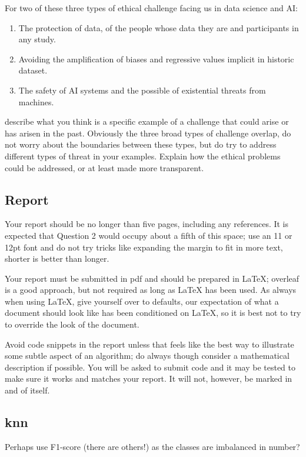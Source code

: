 \documentclass[12pt]{article}
\begin{document}
For two of these three types of ethical challenge facing us in data science and AI:
\begin{enumerate}
\item The protection of data, of the people whose data they are and participants in any study.
\item Avoiding the amplification of biases and regressive values implicit in historic dataset.
\item The safety of AI systems and the possible of existential threats from machines.
\end{enumerate}
describe what you think is a specific example of a challenge that
could arise or has arisen in the past. Obviously the three broad types
of challenge overlap, do not worry about the boundaries between these
types, but do try to address different types of threat in your
examples. Explain how the ethical problems could be addressed, or at
least made more transparent.

\subsection*{Report}

Your report should be no longer than five pages, including any
references. It is expected that Question 2 would occupy about a fifth
of this space; use an 11 or 12pt font and do not try tricks like
expanding the margin to fit in more text, shorter is better than
longer.

Your report must be submitted in pdf and should be prepared in LaTeX;
overleaf is a good approach, but not required as long as LaTeX has
been used. As always when using LaTeX, give yourself over to defaults,
our expectation of what a document should look like has been
conditioned on LaTeX, so it is best not to try to override the look of
the document.

Avoid code snippets in the report unless that feels like the best way
to illustrate some subtle aspect of an algorithm; do always though
consider a mathematical description if possible. You will be asked to
submit code and it may be tested to make sure it works and matches
your report. It will not, however, be marked in and of itself.

\subsection*{knn}

Perhaps use F1-score (there are others!) as the classes are imbalanced in number?
\end{document}

